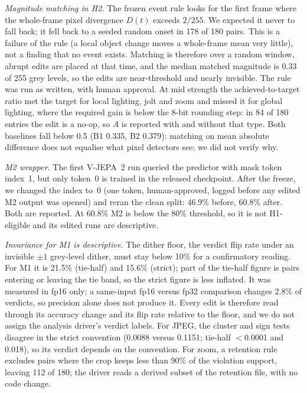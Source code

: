 \emph{Magnitude matching in H2.} The frozen event rule looks for the first frame where the whole-frame pixel divergence $D(t)$ exceeds $2/255$. We expected it never to fall back; it fell back to a seeded random onset in 178 of 180 pairs. This is a failure of the rule (a local object change moves a whole-frame mean very little), not a finding that no event exists. Matching is therefore over a random window, abrupt edits are placed at that time, and the median matched magnitude is 0.33 of 255 grey levels, so the edits are near-threshold and nearly invisible. The rule was run as written, with human approval. At mid strength the achieved-to-target ratio met the target for local lighting, jolt and zoom and missed it for global lighting, where the required gain is below the 8-bit rounding step: in 84 of 180 entries the edit is a no-op, so $A$ is reported with and without that type. Both baselines fall below 0.5 (B1 0.335, B2 0.379): matching on mean absolute difference does not equalise what pixel detectors see; we did not verify why.

\emph{M2 wrapper.} The first V-JEPA~2 run queried the predictor with mask token index~1, but only token~0 is trained in the released checkpoint. After the freeze, we changed the index to~0 (one token, human-approved, logged before any edited M2 output was opened) and reran the clean split: 46.9\% before, 60.8\% after. Both are reported. At 60.8\% M2 is below the 80\% threshold, so it is not H1-eligible and its edited runs are descriptive.

\emph{Invariance for M1 is descriptive.} The dither floor, the verdict flip rate under an invisible $\pm1$ grey-level dither, must stay below 10\% for a confirmatory reading. For M1 it is 21.5\% (tie-half) and 15.6\% (strict); part of the tie-half figure is pairs entering or leaving the tie band, so the strict figure is less inflated. It was measured in fp16 only; a same-input fp16 versus fp32 comparison changes 2.8\% of verdicts, so precision alone does not produce it. Every edit is therefore read through its accuracy change and its flip rate relative to the floor, and we do not assign the analysis driver's verdict labels. For JPEG, the cluster and sign tests disagree in the strict convention (0.0088 versus 0.1151; tie-half $<$0.0001 and 0.018), so its verdict depends on the convention. For zoom, a retention rule excludes pairs where the crop keeps less than 90\% of the violation support, leaving 112 of 180; the driver reads a derived subset of the retention file, with no code change.

